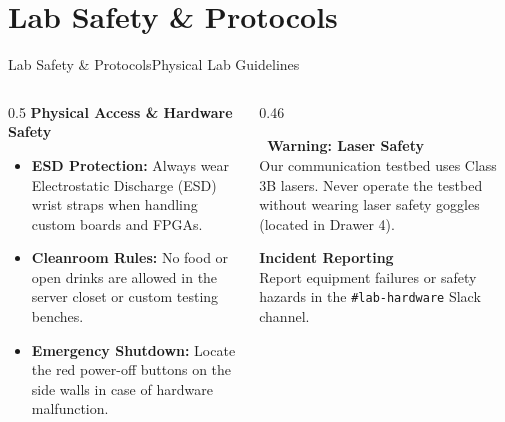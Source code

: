 \section{Lab Safety \& Protocols}

\begin{frame}{Lab Safety \& Protocols}{Physical Lab Guidelines}
  \begin{columns}[T]
    \begin{column}{0.5\textwidth}
      \textbf{Physical Access \& Hardware Safety}
      \begin{itemize}
        \item \textbf{ESD Protection:} Always wear Electrostatic Discharge (ESD) wrist straps when handling custom boards and FPGAs.
        \item \textbf{Cleanroom Rules:} No food or open drinks are allowed in the server closet or custom testing benches.
        \item \textbf{Emergency Shutdown:} Locate the red power-off buttons on the side walls in case of hardware malfunction.
      \end{itemize}
    \end{column}
    
    \begin{column}{0.46\textwidth}
      \begin{alertbox}
        \textbf{\faExclamationTriangle\ Warning: Laser Safety} \\
        Our communication testbed uses Class 3B lasers. Never operate the testbed without wearing laser safety goggles (located in Drawer 4).
      \end{alertbox}
      
      \vspace{0.3cm}
      \begin{highlightbox}
        \textbf{Incident Reporting} \\
        Report equipment failures or safety hazards in the \texttt{\#lab-hardware} Slack channel.
      \end{highlightbox}
    \end{column}
  \end{columns}
\end{frame}

